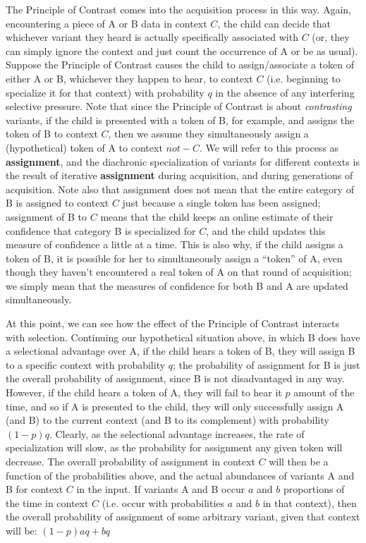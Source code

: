 The Principle of Contrast comes into the acquisition process in this way. Again, encountering a piece of A or B data in context $C$, the child can decide that whichever variant they heard is actually specifically associated with $C$ (or, they can simply ignore the context and just count the occurrence of A or be as usual).
Suppose the Principle of Contrast causes the child to assign/associate a token of either A or B, whichever they happen to hear, to context $C$ (i.e. beginning to specialize it for that context) with probability $q$ in the absence of any interfering selective pressure.
Note that since the Principle of Contrast is about \textsl{contrasting} variants, if the child is presented with a token of B, for example, and assigns the token of B to context $C$, then we assume they simultaneously assign a (hypothetical) token of A to context $not-C$.
We will refer to this process as \textbf{assignment}, and the diachronic specialization of variants for different contexts is the result of iterative \textbf{assignment} during acquisition, and during generations of acquisition.
Note also that assignment does not mean that the entire category of B is assigned to context $C$ just because a single token has been assigned; assignment of B to $C$ means that the child keeps an online estimate of their confidence that category B is specialized for $C$, and the child updates this measure of confidence a little at a time.
This is also why, if the child assigns a token of B, it is possible for her to simultaneously assign a ``token'' of A, even though they haven't encountered a real token of A on that round of acquisition; we simply mean that the measures of confidence for both B and A are updated simultaneously.

At this point, we can see how the effect of the Principle of Contrast interacts with selection.
Continuing our hypothetical situation above, in which B does have a selectional advantage over A, if the child hears a token of B, they will assign B to a specific context with probability $q$; the probability of assignment for B is just the overall probability of assignment, since B is not disadvantaged in any way.
However, if the child hears a token of A, they will fail to hear it $p$ amount of the time, and so if A is presented to the child, they will only successfully assign A (and B) to the current context (and B to its complement) with probability $(1-p)q$.
Clearly, as the selectional advantage increases, the rate of specialization will slow, as the probability for assignment any given token will decrease.
The overall probability of assignment in context $C$ will then be a function of the probabilities above, and the actual abundances of variants A and B for context $C$ in the input.
If variants A and B occur $a$ and $b$ proportions of the time in context $C$ (i.e. occur with probabilities $a$ and $b$ in that context), then the overall probability of assignment of some arbitrary variant, given that context will be: $(1-p)aq + bq$

